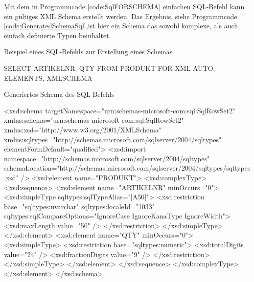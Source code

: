 Mit dem in Programmcode \ref{code:SqlFORSCHEMA} einfachen SQL-Befehl kann ein gültiges XML Schema erstellt werden. Das Ergebnis, siehe Programmcode \ref{code:GeneratedSchemaSql},ist hier ein Schema das sowohl komplexe, als auch einfach definierte Typen beinhaltet.

\begin{program}
\caption{Beispiel eines SQL-Befehls zur Erstellung eines Schemas}
\label{code:SqlFORSCHEMA}
\begin{GenericCode}
    SELECT ARTIKELNR, QTY
    FROM PRODUKT
    FOR XML AUTO, ELEMENTS, XMLSCHEMA
\end{GenericCode}
\end{program}


\begin{program}
\caption{Generiertes Schema des SQL-Befehls}
\label{code:GeneratedSchemaSql}
\begin{XmlCode}
<xsd:schema targetNamespace="urn:schemas-microsoft-com:sql:SqlRowSet2" 
    xmlns:schema="urn:schemas-microsoft-com:sql:SqlRowSet2"
    xmlns:xsd="http://www.w3.org/2001/XMLSchema" 
    xmlns:sqltypes="http://schemas.microsoft.com/sqlserver/2004/sqltypes" 
    elementFormDefault="qualified">
  <xsd:import namespace="http://schemas.microsoft.com/sqlserver/2004/sqltypes" schemaLocation="http://schemas.microsoft.com/sqlserver/2004/sqltypes/sqltypes.xsd" />
  <xsd:element name="PRODUKT">
    <xsd:complexType>
      <xsd:sequence>
        <xsd:element name="ARTIKELNR" minOccurs="0">
          <xsd:simpleType sqltypes:sqlTypeAlias="[A50]">
            <xsd:restriction base="sqltypes:nvarchar" sqltypes:localeId="1033" sqltypes:sqlCompareOptions="IgnoreCase IgnoreKanaType IgnoreWidth">
              <xsd:maxLength value="50" />
            </xsd:restriction>
          </xsd:simpleType>
        </xsd:element>
        <xsd:element name="QTY" minOccurs="0">
          <xsd:simpleType>
            <xsd:restriction base="sqltypes:numeric">
              <xsd:totalDigits value="24" />
              <xsd:fractionDigits value="9" />
            </xsd:restriction>
          </xsd:simpleType>
        </xsd:element>
      </xsd:sequence>
    </xsd:complexType>
  </xsd:element>
</xsd:schema>
\end{XmlCode}
\end{program}


